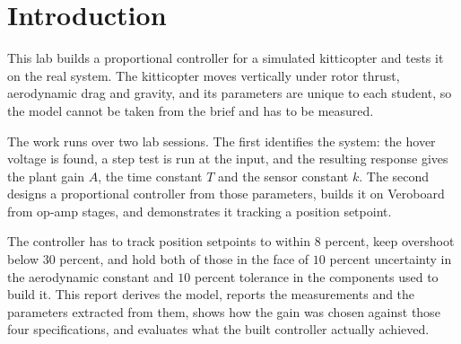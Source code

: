 \section{Introduction}\label{sec:intro}
This lab builds a proportional controller for a simulated kitticopter and tests it on the real
system. The kitticopter moves vertically under rotor thrust, aerodynamic drag and gravity, and
its parameters are unique to each student, so the model cannot be taken from the brief and has
to be measured.

The work runs over two lab sessions. The first identifies the system: the hover voltage is
found, a step test is run at the input, and the resulting response gives the plant gain $A$, the
time constant $T$ and the sensor constant $k$. The second designs a proportional controller from
those parameters, builds it on Veroboard from op-amp stages, and demonstrates it tracking a
position setpoint.

The controller has to track position setpoints to within $8$ percent, keep overshoot below $30$
percent, and hold both of those in the face of $10$ percent uncertainty in the aerodynamic
constant and $10$ percent tolerance in the components used to build it. This report derives the
model, reports the measurements and the parameters extracted from them, shows how the gain was
chosen against those four specifications, and evaluates what the built controller actually
achieved.
